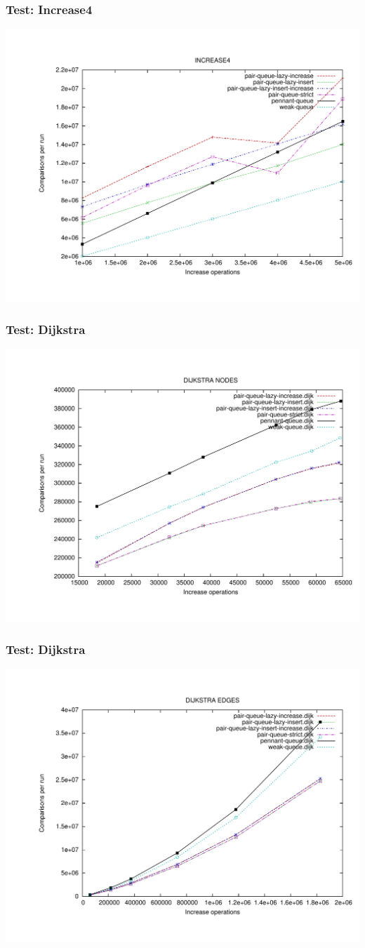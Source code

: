 \documentclass{beamer}
\begin{document}
\begin{frame}
\frametitle{Test: Increase4}
\includegraphics[width=.85\textwidth]{../graphs/increase4.pdf}
\end{frame}
\begin{frame}
\frametitle{Test: Dijkstra}
\includegraphics[width=.85\textwidth]{../graphs/dijk1.pdf}
\end{frame}
\begin{frame}
\frametitle{Test: Dijkstra}
\includegraphics[width=.85\textwidth]{../graphs/dijk2.pdf}
\end{frame}
\end{document}
